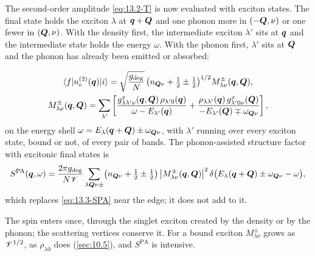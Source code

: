 The second-order amplitude \cref{eq:13.2-T} is now evaluated with exciton states. The final state holds the exciton $\lambda$ at $\bm{q}+\bm{Q}$ and one phonon more in $(-\bm{Q},\nu)$ or one fewer in $(\bm{Q},\nu)$. With the density first, the intermediate exciton $\lambda'$ sits at $\bm{q}$ and the intermediate state holds the energy $\omega$. With the phonon first, $\lambda'$ sits at $\bm{Q}$ and the phonon has already been emitted or absorbed:
\begin{keyresult}
\begin{equation}
  \begin{gathered}
  \langle f|n_e^{(2)}(\bm{q})|i\rangle = \sqrt{\frac{g_{\mathrm{deg}}}{N}}\,\bigl(n_{\bm{Q}\nu} + \tfrac12 \pm \tfrac12\bigr)^{1/2}M^\pm_{\lambda\nu}(\bm{q},\bm{Q}) , \\
  M^\pm_{\lambda\nu}(\bm{q},\bm{Q}) = \sum_{\lambda'}\left[\frac{g^x_{\lambda\lambda'\nu}(\bm{q},\bm{Q})\,\rho_{\lambda'0}(\bm{q})}{\omega - E_{\lambda'}(\bm{q})} + \frac{\rho_{\lambda\lambda'}(\bm{q})\,g^x_{\lambda'0\nu}(\bm{Q})}{-E_{\lambda'}(\bm{Q}) \mp \omega_{\bm{Q}\nu}}\right] ,
  \end{gathered}
  \label{eq:13.8-M}
\end{equation}
on the energy shell $\omega = E_\lambda(\bm{q}+\bm{Q}) \pm \omega_{\bm{Q}\nu}$, with $\lambda'$ running over every exciton state, bound or not, of every pair of bands. The phonon-assisted structure factor with excitonic final states is
\begin{equation}
  S^{\mathrm{PA}}(\bm{q},\omega) = \frac{2\pi g_{\mathrm{deg}}}{N\mathscr{V}}\sum_{\lambda\bm{Q}\nu\pm}\bigl(n_{\bm{Q}\nu} + \tfrac12 \pm \tfrac12\bigr)\,\bigl|M^\pm_{\lambda\nu}(\bm{q},\bm{Q})\bigr|^2\,\delta\bigl(E_\lambda(\bm{q}+\bm{Q}) \pm \omega_{\bm{Q}\nu} - \omega\bigr) ,
  \label{eq:13.8-S}
\end{equation}
which replaces \cref{eq:13.3-SPA} near the edge; it does not add to it.
\end{keyresult}
\noindent The spin enters once, through the singlet exciton created by the density or by the phonon; the scattering vertices conserve it. For a bound exciton $M^\pm_{\lambda\nu}$ grows as $\mathscr{V}^{1/2}$, as $\rho_{\lambda0}$ does (\cref{sec:10.5}), and $S^{\mathrm{PA}}$ is intensive.

